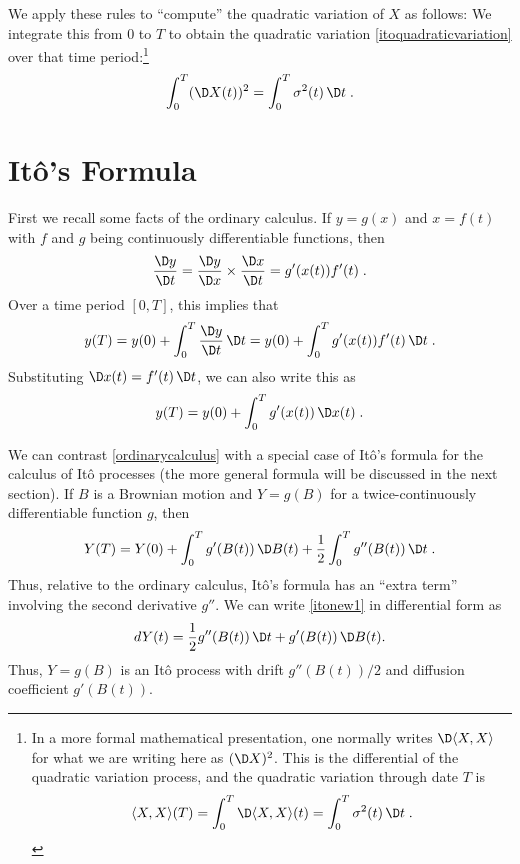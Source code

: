We apply these rules to ``compute'' the quadratic variation of $X$ as follows:
We integrate this from 0 to $T$ to obtain the quadratic variation \eqref{itoquadraticvariation} over that time period:\footnote{In a more formal mathematical presentation, one normally writes $\D\langle X,X\rangle$ for what we are writing here as $(\D X)^2$.  This is the differential of the quadratic variation process, and the quadratic variation through date $T$ is
$$\langle X,X\rangle (T) = \int_0^T \D\langle X,X\rangle(t) = \int_0^T \sigma^2(t)\,\D t\;.$$}
\begin{equation}\label{itoquadraticvariation2}
\int_0^T (\D X(t))^2 = \int_0^T \sigma^2(t)\,\D t\;.
\end{equation}



\section{It\^o's Formula}\label{s_itosformula}

First we recall some facts of the ordinary calculus.  If $y=g(x)$ and $x = f(t)$ with $f$ and $g$ being continuously differentiable functions, then 
$$\frac{\D y}{\D t} = \frac{\D y}{\D x}\times \frac{\D x}{\D t} = g'(x(t))f'(t)\; .$$
Over a time period $[0,T]$, this implies that
$$y(T) = y(0) + \int_0^T \frac{\D y}{\D t}\,\D t = y(0) + \int_0^T g'(x(t))f'(t)\,\D t\; .$$
Substituting $\D x(t) = f'(t)\,\D t$, we can also write this as
\begin{equation}\label{ordinarycalculus}
y(T) = y(0) + \int_0^T g'(x(t))\,\D x(t)\;.
\end{equation}

We can contrast  \eqref{ordinarycalculus}  with a special case of It\^o's formula for the calculus of It\^o processes (the more general formula will be discussed in the next section).  If $B$ is a Brownian motion and $Y = g(B)$ for a twice-continuously differentiable function $g$, then 
\begin{equation}\label{itonew1}
Y(T) = Y(0) + \int_0^T g'(B(t))\,\D B(t) + \frac{1}{2}\int_0^T g''(B(t))\,\D t\;.
\end{equation}
Thus, relative to the ordinary calculus, It\^o's formula has an ``extra term'' involving the second derivative $g''$.  We can write \eqref{itonew1} in differential form as
$$dY(t) = \frac{1}{2}g''(B(t))\,\D t + g'(B(t))\,\D B(t).$$
Thus, $Y=g(B)$ is an It\^o process with drift $g''(B(t))/2$ and diffusion coefficient $g'(B(t))$.

